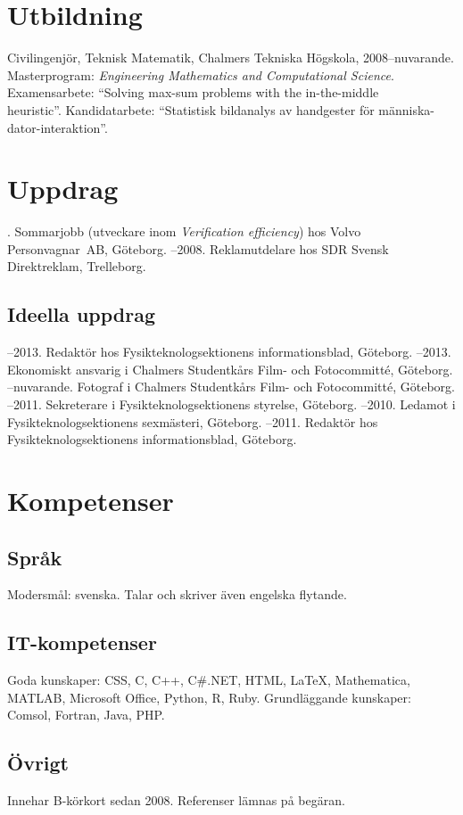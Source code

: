 \documentclass{skvitae}
\author{Simon Sigurdhsson}
\affiliation{}
\begin{document}
	\maketitle

	\section{Utbildning}
	\ind Civilingenjör, Teknisk Matematik, Chalmers Tekniska Högskola, 2008--nuvarande.\\Masterprogram: \emph{Engineering Mathematics and Computational Science}.\\Examensarbete: \foreignquote{english}{Solving max-sum problems with the in-the-middle\\heuristic}. Kandidatarbete: \enquote{Statistisk bildanalys av handgester för människa-dator-interaktion}.

	\section{Uppdrag}
	. Sommarjobb (utveckare inom \emph{Verification efficiency}) hos Volvo Person\-vagnar~AB, Göteborg.
	--2008. Reklamutdelare hos SDR Svensk Direktreklam, Trelleborg.

	\medskip
	\subsection{Ideella uppdrag}
	--2013. Redaktör hos Fysikteknologsektionens informationsblad, Göteborg.
	--2013. Ekonomiskt ansvarig i Chalmers Studentkårs Film- och Fotocommitté, Göteborg.
	--nuvarande. Fotograf i Chalmers Studentkårs Film- och Fotocommitté, Göteborg.
	--2011. Sekreterare i Fysikteknologsektionens styrelse, Göteborg.
	--2010. Ledamot i Fysikteknologsektionens sexmästeri, Göteborg.
	--2011. Redaktör hos Fysikteknologsektionens informationsblad, Göteborg.

	\section{Kompetenser}
	\subsection{Språk}
	\ind Modersmål: svenska. Talar och skriver även engelska flytande.

	\medskip
	\subsection{IT-kompetenser}
	\ind Goda kunskaper: CSS, C, C++, C\#.NET, HTML, \LaTeX, Mathematica, MATLAB, Microsoft Office, Python, R, Ruby.
	\ind Grundläggande kunskaper: Comsol, Fortran, Java, PHP.

	\medskip
	\subsection{Övrigt}
	\ind Innehar B-körkort sedan 2008.
	\ind Referenser lämnas på begäran.
\end{document}
